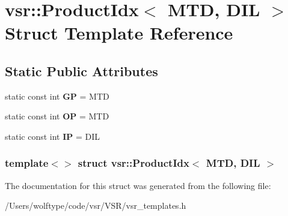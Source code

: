 \hypertarget{structvsr_1_1_product_idx_3_01_m_t_d_00_01_d_i_l_01_4}{\section{vsr\-:\-:Product\-Idx$<$ M\-T\-D, D\-I\-L $>$ Struct Template Reference}
\label{structvsr_1_1_product_idx_3_01_m_t_d_00_01_d_i_l_01_4}
}
\subsection*{Static Public Attributes}
\begin{DoxyCompactItemize}
\item 
\hypertarget{structvsr_1_1_product_idx_3_01_m_t_d_00_01_d_i_l_01_4_ad33e4e32f982a5e04d29abec5697ab4c}{static const int {\bfseries G\-P} = M\-T\-D}\label{structvsr_1_1_product_idx_3_01_m_t_d_00_01_d_i_l_01_4_ad33e4e32f982a5e04d29abec5697ab4c}

\item 
\hypertarget{structvsr_1_1_product_idx_3_01_m_t_d_00_01_d_i_l_01_4_a13c80f0e9834d17742fff2a40e49f7de}{static const int {\bfseries O\-P} = M\-T\-D}\label{structvsr_1_1_product_idx_3_01_m_t_d_00_01_d_i_l_01_4_a13c80f0e9834d17742fff2a40e49f7de}

\item 
\hypertarget{structvsr_1_1_product_idx_3_01_m_t_d_00_01_d_i_l_01_4_a36f35fdd16676c3ee556f8e6e55e74d8}{static const int {\bfseries I\-P} = D\-I\-L}\label{structvsr_1_1_product_idx_3_01_m_t_d_00_01_d_i_l_01_4_a36f35fdd16676c3ee556f8e6e55e74d8}

\end{DoxyCompactItemize}
\subsubsection*{template$<$$>$ struct vsr\-::\-Product\-Idx$<$ M\-T\-D, D\-I\-L $>$}



The documentation for this struct was generated from the following file\-:\begin{DoxyCompactItemize}
\item 
/\-Users/wolftype/code/vsr/\-V\-S\-R/vsr\-\_\-templates.\-h\end{DoxyCompactItemize}
